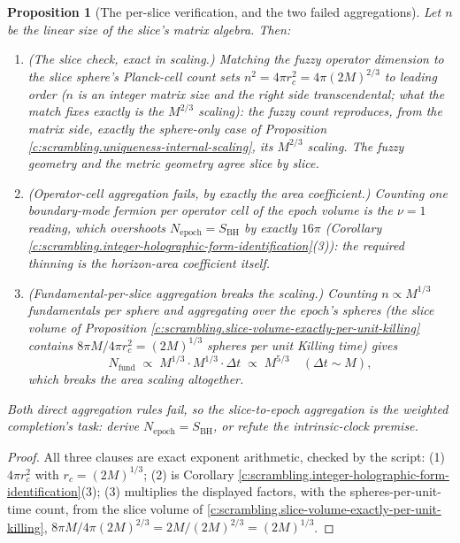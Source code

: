 \documentclass[11pt]{article}
\newtheorem{proposition}[theorem]{Proposition}
\theoremstyle{definition}
\theoremstyle{plain}
\newcommand{\changedmark}[2]{\marginpar{\raggedright\scriptsize\color{#1}#2}}
\providecommand{\SBH}{}\renewcommand{\SBH}{S_{\mathrm{BH}}}
\begin{document}
\begin{proposition}[The per-slice verification, and the two failed aggregations]\label{c:scrambling.per-slice-verification-two-failed-aggregations}
\changedmark{gray}{reworded}
Let $n$ be the linear size of the slice's matrix algebra. Then:
\begin{enumerate}
\item \emph{(The slice check, exact in scaling.)} Matching the fuzzy operator dimension to the slice sphere's Planck-cell count sets $n^2 = 4\pi r_c^2 = 4\pi(2M)^{2/3}$ to leading order ($n$ is an integer matrix size and the right side transcendental; what the match fixes exactly is the $M^{2/3}$ scaling): the fuzzy count reproduces, from the matrix side, exactly the sphere-only case of Proposition \ref{c:scrambling.uniqueness-internal-scaling}, its $M^{2/3}$ scaling. The fuzzy geometry and the metric geometry agree slice by slice.
\item \emph{(Operator-cell aggregation fails, by exactly the area coefficient.)} Counting one boundary-mode fermion per operator cell of the epoch volume is the $\nu = 1$ reading, which overshoots $N_{\mathrm{epoch}} = \SBH$ by exactly $16\pi$ (Corollary \ref{c:scrambling.integer-holographic-form-identification}(3)): the required thinning is the horizon-area coefficient itself.
\item \emph{(Fundamental-per-slice aggregation breaks the scaling.)} Counting $n \propto M^{1/3}$ fundamentals per sphere and aggregating over the epoch's spheres (the slice volume of Proposition \ref{c:scrambling.slice-volume-exactly-per-unit-killing} contains $8\pi M/4\pi r_c^2 = (2M)^{1/3}$ spheres per unit Killing time) gives
\[
N_{\mathrm{fund}} \;\propto\; M^{1/3}\cdot M^{1/3}\cdot \Delta t \;\propto\; M^{5/3} \quad (\Delta t \sim M),
\]
which breaks the area scaling altogether.
\end{enumerate}
Both direct aggregation rules fail, so the slice-to-epoch aggregation is the weighted completion's task: derive $N_{\mathrm{epoch}} = \SBH$, or refute the intrinsic-clock premise.
\end{proposition}
\begin{proof}
All three clauses are exact exponent arithmetic, checked by the script: (1) $4\pi r_c^2$ with $r_c = (2M)^{1/3}$; (2) is Corollary \ref{c:scrambling.integer-holographic-form-identification}(3); (3) multiplies the displayed factors, with the spheres-per-unit-time count, from the slice volume of \ref{c:scrambling.slice-volume-exactly-per-unit-killing}, $8\pi M / 4\pi(2M)^{2/3} = 2M/(2M)^{2/3} = (2M)^{1/3}$.

\end{proof}
\end{document}
